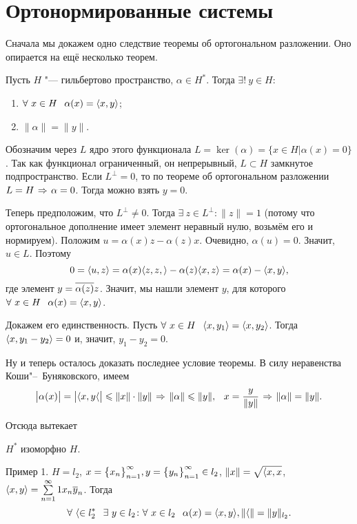 \section{Ортонормированные системы}
Сначала мы докажем одно следствие теоремы об ортогональном разложении. Оно опирается на ещё несколько теорем.
\begin{The}[Рисса]
  Пусть $H$ "--- гильбертово пространство, $\alpha\in H^*$. Тогда $\exists!\ y\in H\colon$
\begin{enumerate}
  \item $\forall\ x\in H\pau \alpha(x) = \la x,y\ra$;
  \item $\|\alpha\| = \|y\|$.
\end{enumerate}
\end{The}
\begin{Proof}
	Обозначим через $L$ ядро этого функционала $L = \ker(\alpha) = \big\{x\in H\big|\alpha(x) = 0\big\}$. Так как функционал ограниченный, он непрерывный,  $L\subset H$ замкнутое подпространство.
	Если $L^\perp=0$, то по теореме об ортогональном разложении $L=H\imp\alpha=0$. Тогда можно взять $y=0$.

	Теперь предположим, что $L^\perp\ne0$. Тогда $\exists\ z\in L^\perp\colon \|z\|=1$ (потому что ортогональное дополнение имеет элемент неравный нулю, возьмём его и нормируем). Положим $u = \alpha(x)z - \alpha(z)x$. Очевидно, $\alpha(u) = 0$. Значит, $u\in L$. Поэтому
	\[
		0=\langle u,z\rangle = \alpha(x)\langle z,z,\rangle - \alpha(z)\langle x,z\rangle = \alpha(x) - \langle x,y\rangle,
	\]
	где элемент $y = \overline{\alpha(z)} z$. Значит, мы нашли элемент $y$, для которого $\forall\ x\in H\pau \alpha(x) = \la x,y\ra$.

Докажем его единственность. Пусть $\forall\ x\in H\pau\la x,y_1\ra = \la x,y_2\ra$. Тогда $\langle x,y_1-y_2\rangle=0$ и, значит, $y_1-y_2=0$.

Ну и теперь осталось доказать последнее условие теоремы. В силу неравенства Коши"--~Буняковского, имеем
\[
	\big|\alpha(x)\big| = \big|\la x,y\la\big|\le \|x\|\cdot\|y\|\imp\|\alpha\|\le \|y\|,\pau x = \frac{y}{\|y\|}\imp\|\alpha\| = \|y\|.
\]
\end{Proof}

Отсюда вытекает
\begin{Sl}
  $H^*$ изоморфно $H$.
\end{Sl}

Пример 1. $H=l_2$, $x = \big\{{x}_{n}\big\}_{n=1}^\infty, y = \big\{{y}_{n}\big\}_{n=1}^\infty\in l_2$, $\|x\| = \sqrt{\langle x,x}$, $\langle x,y\rangle = \sum\limits_{{n}={1}}^\infty1x_n\overline{y}_n$. Тогда
\[
	\forall\ \a\in l_2^*\pau \exists\ y\in l_2\colon \forall\ x\in l_2\pau \alpha(x) = \la x,y\ra, \|\a\| = \|y\|_{l_2}.
\]

